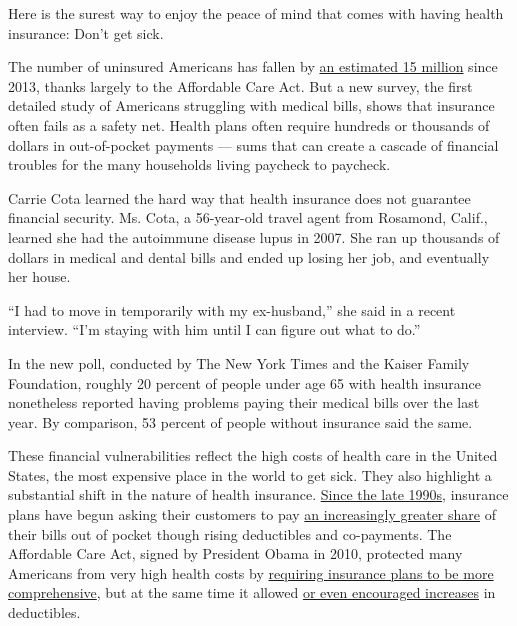 Here is the surest way to enjoy the peace of mind that comes with having
health insurance: Don't get sick.

The number of uninsured Americans has fallen by
\href{https://aspe.hhs.gov/basic-report/health-insurance-coverage-and-affordable-care-act-september-2015}{an
estimated 15 million} since 2013, thanks largely to the Affordable Care
Act. But a new survey, the first detailed study of Americans struggling
with medical bills, shows that insurance often fails as a safety net.
Health plans often require hundreds or thousands of dollars in
out-of-pocket payments --- sums that can create a cascade of financial
troubles for the many households living paycheck to paycheck.

Carrie Cota learned the hard way that health insurance does not
guarantee financial security. Ms. Cota, a 56-year-old travel agent from
Rosamond, Calif., learned she had the autoimmune disease lupus in 2007.
She ran up thousands of dollars in medical and dental bills and ended up
losing her job, and eventually her house.

``I had to move in temporarily with my ex-husband,'' she said in a
recent interview. ``I'm staying with him until I can figure out what to
do.''

In the new poll, conducted by The New York Times and the Kaiser Family
Foundation, roughly 20 percent of people under age 65 with health
insurance nonetheless reported having problems paying their medical
bills over the last year. By comparison, 53 percent of people without
insurance said the same.

These financial vulnerabilities reflect the high costs of health care in
the United States, the most expensive place in the world to get sick.
They also highlight a substantial shift in the nature of health
insurance.
\href{http://kff.org/interactive/premiums-and-worker-contributions/}{Since
the late 1990s}, insurance plans have begun asking their customers to
pay
\href{http://www.nytimes.com/2015/09/23/business/health-insurance-deductibles-outpacing-wage-increases-study-finds.html?_r=0}{an
increasingly greater share} of their bills out of pocket though rising
deductibles and co-payments. The Affordable Care Act, signed by
President Obama in 2010, protected many Americans from very high health
costs by
\href{http://www.nytimes.com/2012/11/21/us/politics/administration-defines-benefits-under-health-law.html}{requiring
insurance plans to be more comprehensive}, but at the same time it
allowed
\href{http://www.nytimes.com/2013/05/28/business/cadillac-tax-health-insurance.html}{or
even encouraged increases} in deductibles.

